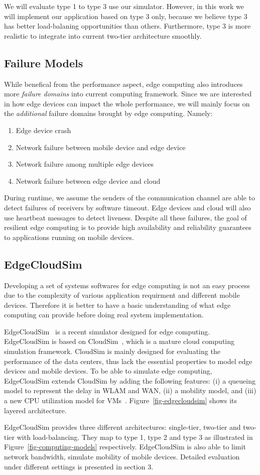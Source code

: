 We will evaluate type 1 to type 3 use our simulator. However, in this work we will implement our
application based on type 3 only, because we believe type 3 has better load-balaning opportunities
than others. Furthermore, type 3 is more realistic to integrate into current two-tier architecture smoothly.

\subsection{Failure Models}
\label{sec:failure-models}
While benefical from the performance aspect, edge computing also introduces more
{\em failure domains} into current computing framework. Since we are interested
in how edge devices can impact the whole performance, we will mainly focus on
the {\em additional} failure domains brought by edge computing. Namely:
\begin{enumerate}
\item Edge device crash
\item Network failure between mobile device and edge device
\item Network failure among multiple edge devices
\item Network failure between edge device and cloud
\end{enumerate}

During runtime, we assume the senders of the communication channel are able to detect failures
of receivers by software timeout. Edge devices and cloud will also use heartbeat
messages to detect liveness. Despite all these failures, the goal of resilient
edge computing is to provide high availability and reliability guarantees to
applications running on mobile devices.

\subsection{EdgeCloudSim}
Developing a set of systems softwares for edge computing is not an easy process due
to the complexity of various application requirment and different mobile devices.
Therefore it is better to have a basic understanding of what edge computing can provide
before doing real system implementation.

EdgeCloudSim~\cite{edgecloudsim} is a recent simulator designed for edge computing.
EdgeCloudSim is based on CloudSim~\cite{cloudsim}, which is a mature cloud computing simulation framework.
CloudSim is mainly designed for evaluating the performance of the data centers, thus lack the essential
properties to model edge devices and mobile devices. To be able to simulate edge computing, EdgeCloudSim
extends CloudSim by adding the following features: (i) a queueing model to represent the delay in WLAM and WAN,
(ii) a mobility model, and (iii) a new CPU utilization model for VMs~\cite{edgecloudsim}.
Figure~\ref{fig-edgecloudsim} shows its layered architecture.

EdgeCloudSim provides three different architectures: single-tier, two-tier and two-tier with load-balancing.
They map to type 1, type 2 and type 3 as illustrated in Figure~\ref{fig-computing-models} respectively.
EdgeCloudSim is also able to limit network bandwidth, simulate mobility of mobile devices.
Detailed evaluation under different settings is presented in section 3.
